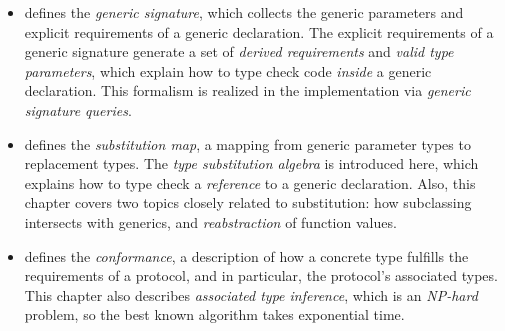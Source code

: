 \documentclass[../generics]{subfiles}
\begin{document}
\begin{itemize}
\item {} defines the \emph{generic signature}, which collects the generic parameters and explicit requirements of a generic declaration. The explicit requirements of a generic signature generate a set of \emph{derived requirements} and \emph{valid type parameters}, which explain how to type check code \emph{inside} a generic declaration. This formalism is realized in the implementation via \emph{generic signature queries}.

\item {} defines the \emph{substitution map}, a mapping from generic parameter types to replacement types. The \emph{type substitution algebra} is introduced here, which explains how to type check a \emph{reference} to a generic declaration. Also, this chapter covers two topics closely related to substitution: how subclassing intersects with generics, and \emph{reabstraction} of function values.

\item {} defines the \emph{conformance}, a description of how a concrete type fulfills the requirements of a protocol, and in particular, the protocol's associated types. This chapter also describes \emph{associated type inference}, which is an \emph{NP-hard} problem, so the best known algorithm takes exponential time.
\end{itemize}
\end{document}
